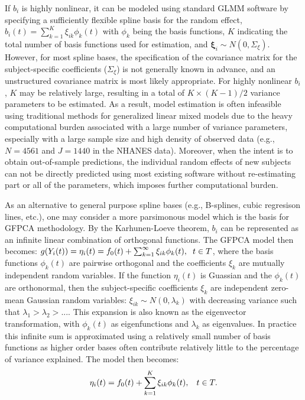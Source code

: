 \documentclass[12pt]{article}
\begin{document}
If $b_i$ is highly nonlinear, it can be modeled using standard GLMM software by specifying a sufficiently flexible spline basis for the random effect, $b_i(t) = \sum_{k=1}^K \xi_{ik} \phi_k(t)$ with $\phi_k$ being the basis functions, $K$ indicating the total number of basis functions used for estimation, and $\boldsymbol{\xi}_{i} \sim N(0, \Sigma_\xi)$. However, for most spline bases, the specification of the covariance matrix for the subject-specific coefficients ($\Sigma_\xi$) is not generally known in advance, and an unstructured covariance matrix is most likely appropriate. For highly nonlinear $b_i$, $K$ may be relatively large, resulting in a total of $K \times (K-1)/2$ variance parameters to be estimated. As a result, model estimation is often infeasible using traditional methods for generalized linear mixed models due to the heavy computational burden associated with a large number of variance parameters, especially with a large sample size and high density of observed data (e.g., $N = 4561$ and $J = 1440$ in the NHANES data). Moreover, when the intent is to obtain out-of-sample predictions, the individual random effects of new subjects can not be directly predicted using most existing software without re-estimating part or all of the parameters, which imposes further computational burden. 

As an alternative to general purpose spline bases (e.g., B-splines, cubic regresison lines, etc.), one may consider a more parsimonous model which is the basis for GFPCA methodology. By the Karhunen-Loeve theorem, $b_i$ can be represented as an infinite linear combination of orthogonal functions. The GFPCA model then becomes: $
    g(Y_i(t)) = \eta_i(t) = f_0(t)+\sum_{k=1}^{\infty}\xi_{ik}\phi_k(t), \hspace{0.2cm}
    t  \in T$, where the basis functions $\phi_k(t)$ are pairwise orthogonal and the coefficients $\xi_{k}$ are mutually independent random variables. If the function $\eta_i(t)$ is Guassian and the $\phi_k(t)$ are orthonormal, then the subject-specific coefficients $\xi_k$ are independent zero-mean Gaussian random variables:  $\xi_{ik} \sim N(0, \lambda_k)$ with decreasing variance such that $\lambda_1 > \lambda_2 >...$. This expansion is also known as the eigenvector transformation, with $\phi_k(t)$ as 
 eigenfunctions and $\lambda_k$ as eigenvalues. In practice this infinite sum is approximated using a relatively small number of basis functions as higher order bases often contribute relatively little to the percentage of variance explained. The model then becomes:
\begin{equation}
   \eta_i(t) = f_0(t)+\sum_{k=1}^{K}\xi_{ik}\phi_k(t), \hspace{0.3cm}
    t  \in T.
    \label{eq:gfpca}
\end{equation}
\end{document}
